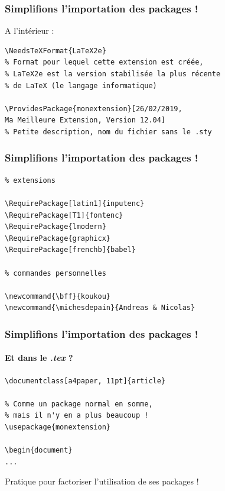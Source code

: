 \documentclass[handout]{beamer}
\begin{document}
\begin{frame}[fragile=singleslide]
\frametitle{Simplifions l'importation des packages !}
A l'intérieur :\\
\begin{verbatim}
\NeedsTeXFormat{LaTeX2e} 
% Format pour lequel cette extension est créée,
% LaTeX2e est la version stabilisée la plus récente 
% de LaTeX (le langage informatique)

\ProvidesPackage{monextension}[26/02/2019, 
Ma Meilleure Extension, Version 12.04] 
% Petite description, nom du fichier sans le .sty
\end{verbatim}
\end{frame}

\begin{frame}[fragile=singleslide]
\frametitle{Simplifions l'importation des packages !}
\begin{verbatim}
% extensions

\RequirePackage[latin1]{inputenc}
\RequirePackage[T1]{fontenc}
\RequirePackage{lmodern}
\RequirePackage{graphicx}
\RequirePackage[frenchb]{babel}

% commandes personnelles

\newcommand{\bff}{koukou} 
\newcommand{\michesdepain}{Andreas & Nicolas}
\end{verbatim}
\end{frame}

\begin{frame}[fragile=singleslide]
\frametitle{Simplifions l'importation des packages !}
\framesubtitle{Et dans le \textit{.tex} ?}
\begin{verbatim}
\documentclass[a4paper, 11pt]{article}

% Comme un package normal en somme, 
% mais il n'y en a plus beaucoup !
\usepackage{monextension} 

\begin{document}
...
\end{verbatim}


\centering 
Pratique pour factoriser l'utilisation de ses packages !

\end{frame}

\end{document}
